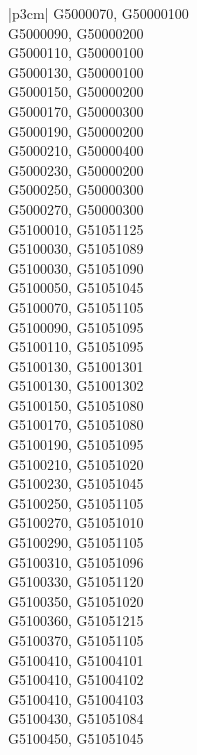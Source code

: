 \begin{customLongTable}{ |p{3cm}| }
G5000070, G50000100 \\ \hline
G5000090, G50000200 \\ \hline
G5000110, G50000100 \\ \hline
G5000130, G50000100 \\ \hline
G5000150, G50000200 \\ \hline
G5000170, G50000300 \\ \hline
G5000190, G50000200 \\ \hline
G5000210, G50000400 \\ \hline
G5000230, G50000200 \\ \hline
G5000250, G50000300 \\ \hline
G5000270, G50000300 \\ \hline
G5100010, G51051125 \\ \hline
G5100030, G51051089 \\ \hline
G5100030, G51051090 \\ \hline
G5100050, G51051045 \\ \hline
G5100070, G51051105 \\ \hline
G5100090, G51051095 \\ \hline
G5100110, G51051095 \\ \hline
G5100130, G51001301 \\ \hline
G5100130, G51001302 \\ \hline
G5100150, G51051080 \\ \hline
G5100170, G51051080 \\ \hline
G5100190, G51051095 \\ \hline
G5100210, G51051020 \\ \hline
G5100230, G51051045 \\ \hline
G5100250, G51051105 \\ \hline
G5100270, G51051010 \\ \hline
G5100290, G51051105 \\ \hline
G5100310, G51051096 \\ \hline
G5100330, G51051120 \\ \hline
G5100350, G51051020 \\ \hline
G5100360, G51051215 \\ \hline
G5100370, G51051105 \\ \hline
G5100410, G51004101 \\ \hline
G5100410, G51004102 \\ \hline
G5100410, G51004103 \\ \hline
G5100430, G51051084 \\ \hline
G5100450, G51051045 \\ \hline

\end{customLongTable}

